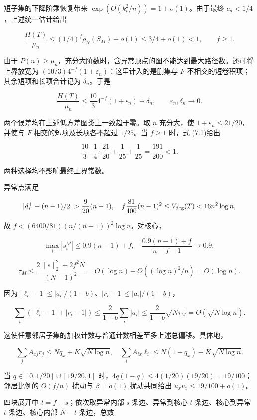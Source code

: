 \documentclass[11pt,a4paper]{article}
\begin{document}
短子集的下降阶乘恢复带来 \(\exp(O(k_n^2/n))=1+o(1)\)。由于最终 \(c_n<1/4\)，上述统一估计给出

\[
\frac{H(T)}{\mu_n}
\le(1/4)^f\rho_N(S_M)+o(1)
\le 3/4+o(1)<1,\qquad f\ge1.
\]

由于 \(P(n)\ge\mu_n\)，充分大阶数时，含异常顶点的图不能达到最大路径数。还可将上界放宽为 \((10/3)4^{-f}(1+\varepsilon_n)\)：这里计入的是删集与 \(F\) 不相交的短卷积项；其余短项和长项合计记为 \(\delta_n\)。于是

\begin{equation}
\frac{H(T)}{\mu_n}\le\frac{10}{3}4^{-f}(1+\varepsilon_n)+\delta_n,
\qquad \varepsilon_n,\delta_n\longrightarrow0.
\tag{7.1}
\label{eq-exceptional-bound}
\end{equation}

两个误差均在上述低方差图类上一致趋于零。取 \(n\) 充分大，使 \(1+\varepsilon_n\le21/20\)，并使与 \(F\) 相交的短项及长项各不超过 \(1/25\)。当 \(f\ge1\) 时，\hyperref[eq-exceptional-bound]{式 (7.1)}给出

\[
\frac{10}{3}\cdot\frac14\cdot\frac{21}{20}+\frac1{25}+\frac1{25}
=\frac{191}{200}<1.
\]

两种选择均不影响最终上界常数。

异常点满足

\[
|d_i^+-(n-1)/2|>\frac9{20}(n-1),\quad
f\frac{81}{400}(n-1)^2\le V_{\rm deg}(T)<16n^2\log n,
\]

故 \(f<(6400/81)(n/(n-1))^2\log n\)。对核心，

\[
\max_i|s_i^M|\le0.9(n-1)+f,
\quad \frac{0.9(n-1)+f}{n-f-1}\longrightarrow0.9,
\]

\[
\tau_M\le\frac{2\|s\|_2^2+2f^2N}{(N-1)^2}
=O(\log n)+O((\log n)^2/n)=O(\log n).
\]

因为 \(|\ell_i-1|\le|a_i|/(1-b)\)、\(|r_i-1|\le|a_i|/(1-b)\)，

\[
\sum_i(|\ell_i-1|+|r_i-1|)
\le\frac2{1-b}\sum_i|a_i|
\le\frac2{1-b}\sqrt{N\tau_M}=O(\sqrt{N\log n}).
\]

这使任意邻居子集的加权计数与普通计数相差至多上述总偏移。具体地，

\[
\sum_jA_{xj}r_j\le Nq_x+K\sqrt{N\log n},\quad
\sum_iA_{ix}\ell_i\le N(1-q_x)+K\sqrt{N\log n}.
\]

当 \(q\in[0,1/20]\cup[19/20,1]\) 时，\(4q(1-q)\le4(1/20)(19/20)=19/100\)；邻居比例的 \(O(f/n)\) 扰动与 \(\beta=o(1)\) 扰动共同给出 \(u_xv_x\le19/100+o(1)\)。

四块展开中 \(t=f-s\)；依次取异常内部 \(s\) 条边、异常到核心 \(t\) 条边、核心到异常 \(t\) 条边、核心内部 \(N-t\) 条边，总数
\end{document}
